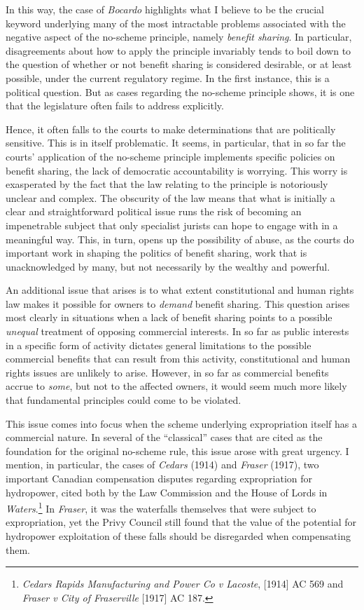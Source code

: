 In this way, the case of \emph{Bocardo} highlights what I believe to be the crucial keyword underlying many of the most intractable problems associated with the negative aspect of the no-scheme principle, namely {\it benefit sharing}. In particular, disagreements about how to apply the principle invariably tends to boil down to the question of whether or not benefit sharing is considered desirable, or at least possible, under the current regulatory regime. In the first instance, this is a political question. But as cases regarding the no-scheme principle shows, it is one that the legislature often fails to address explicitly. 

Hence, it often falls to the courts to make determinations that are politically sensitive. This is in itself problematic. It seems, in particular, that in so far the courts' application of the no-scheme principle implements specific policies on benefit sharing, the lack of democratic accountability is worrying. This worry is exasperated by the fact that the law relating to the principle is notoriously unclear and complex. The obscurity of the law means that what is initially a clear and straightforward political issue runs the risk of becoming an impenetrable subject that only specialist jurists can hope to engage with in a meaningful way. This, in turn, opens up the possibility of abuse, as the courts do important work in shaping the politics of benefit sharing, work that is unacknowledged by many, but not necessarily by the wealthy and powerful.

An additional issue that arises is to what extent constitutional and human rights law makes it possible for owners to {\it demand} benefit sharing. This question arises most clearly in situations when a lack of benefit sharing points to a possible {\it unequal} treatment of opposing commercial interests. In so far as public interests in a specific form of activity dictates general limitations to the possible commercial benefits that can result from this activity, constitutional and human rights issues are unlikely to arise. However, in so far as commercial benefits accrue to {\it some}, but not to the affected owners, it would seem much more likely that fundamental principles could come to be violated.

This issue comes into focus when the scheme underlying expropriation itself has a commercial nature. In several of the ``classical'' cases that are cited as the foundation for the original no-scheme rule, this issue arose with great urgency. I mention, in particular, the cases of \emph{Cedars} (1914) and \emph{Fraser} (1917), two important Canadian compensation disputes regarding expropriation for hydropower, cited both by the Law Commission and the House of Lords in \emph{Waters}.\footnote{\emph{Cedars Rapids Manufacturing and Power Co v Lacoste}, [1914] AC 569 and \emph{Fraser v City of Fraserville} [1917] AC 187.} In \emph{Fraser}, it was the waterfalls themselves that were subject to expropriation, yet the Privy Council still found that the value of the potential for hydropower exploitation of these falls should be disregarded when compensating them.

